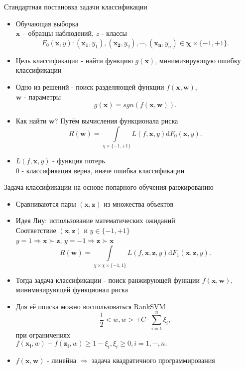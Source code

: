 \documentclass[11pt]{beamer}
\begin{document}
\begin{frame}{Стандартная постановка задачи классификации}

\begin{itemize}
	\item Обучающая выборка \\
		\(\mathbf{x}\) – образцы наблюдений, \(z\) - классы
		\[F_{0}(\mathbf{x}, y): (\mathbf{x_1}, y_1), (\mathbf{x_2}, y_2), \cdots, (\mathbf{x_n}, y_n) \in \mathbf{\chi} \times  \{-1, +1\}. \]
	\item Цель классификации - найти функцию \(g(\mathbf{x})\), минимизирующую ошибку классификации
	\item Одно из решений - поиск разделяющей функции \(f(\mathbf{x}, \mathbf{w})\), \\
		\(\mathbf{w}\) - параметры
		\[g(\mathbf{x}) = sgn(f(\mathbf{x}, \mathbf{w})).\]
	\item Как найти \(\mathbf{w}\)? Путём вычисления функционала риска
		\[R(\mathbf{w}) = \int \limits_{\chi \times \{-1, +1\}} L(f, \mathbf{x}, y) \mathrm{d} F_0(\mathbf{x}, y).\]
	\item \(L(f, \mathbf{x}, y)\) - функция потерь \\
		\(0\) - классификация верна, иначе ошибка классификации
\end{itemize}

\end{frame}
\begin{frame}{Задача классификации на основе попарного обучения ранжированию}

\begin{itemize}
	\item Сравниваются пары \((\mathbf{x}, \mathbf{z})\) из множества объектов
	\item Идея Лиу: использование математических ожиданий \\
	Соответствие \((\mathbf{x}, \mathbf{z})\) и \(y \in \{-1, +1\}\) \\
		\(y = 1 \Rightarrow \mathbf{x} \succ \mathbf{z}\), \(y = -1 \Rightarrow \mathbf{z} \succ \mathbf{x}\)
		\[R(\mathbf{w}) = \int \limits_{\chi \times \chi \times \{-1, 1\}} L(f, \mathbf{x}, \mathbf{z}, y) \mathrm{d} F_1(\mathbf{x}, \mathbf{z}, y).\]
	\item Тогда задача классификации - поиск ранжирующей функции \(f(\mathbf{x}, \mathbf{w})\), минимизирующей функционал риска
	\item Для её поиска можно воспользоваться RankSVM
		\[\frac{1}{2}<w, w> + C \cdot \sum \limits_{i=1}^n \xi_i,\]
		при ограничениях \\
		\(f(\mathbf{x_i}, w) - f(\mathbf{z_i}, w) \geq 1 - \xi_i, \xi_i \geq 0, i = 1, \cdots, n.\)
	\item \(f(\mathbf{x}, \mathbf{w})\) - линейна \(\Rightarrow\) задача квадратичного программирования
\end{itemize}

\end{frame}
\end{document}
